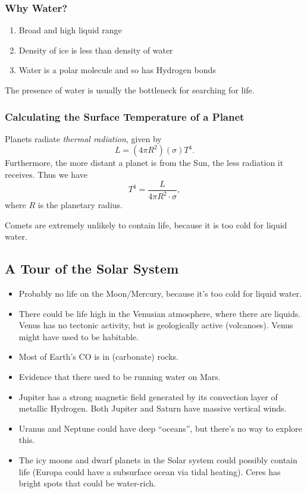 \documentclass[class=article, crop=false]{standalone}
\begin{document}
  \subsubsection{Why Water?}
  \begin{enumerate}
    \item Broad and high liquid range
    \item Density of ice is less than density of water
    \item Water is a polar molecule and so has Hydrogen bonds
  \end{enumerate}
  \begin{note}{}
    The presence of water is usually the bottleneck for searching for life.
  \end{note}
  \subsubsection{Calculating the Surface Temperature of a Planet}
  Planets radiate \emph{thermal radiation}, given by
  \[
    L = (4\pi R^2)(\sigma) T^4.
  \]
  Furthermore, the more distant a planet is from the Sun, the less radiation it receives. Thus we have
  \[
    T^4 = \frac{L}{4\pi R^2\cdot \sigma},
  \]
  where $R$ is the planetary radius.
  \begin{note}{}
    Comets are extremely unlikely to contain life, because it is too cold for liquid water.
  \end{note}
  \subsection{A Tour of the Solar System}
  \begin{itemize}
    \item Probably no life on the Moon/Mercury, because it's too cold for liquid water.
    \item There could be life high in the Venusian atmosphere, where there are liquids. Venus has no tectonic activity, but is geologically active (volcanoes). Venus might have used to be habitable.
    \item Most of Earth's CO is in (carbonate) rocks.
    \item Evidence that there used to be running water on Mars.
    \item Jupiter has a strong magnetic field generated by its convection layer of metallic Hydrogen. Both Jupiter and Saturn have massive vertical winds.
    \item Uranus and Neptune could have deep ``oceans'', but there's no way to explore this.
    \item The icy moons and dwarf planets in the Solar system could possibly contain life (Europa could have a subsurface ocean via tidal heating). Ceres has bright spots that could be water-rich.
  \end{itemize}
\end{document}
